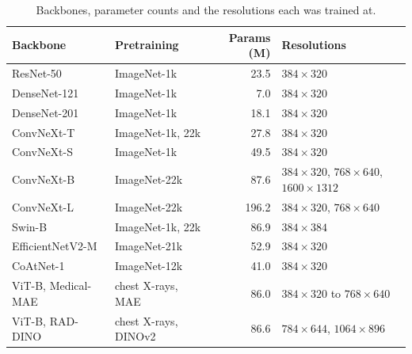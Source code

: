\documentclass{article}
\begin{document}
\begin{table}[H]
  \caption{Backbones, parameter counts and the resolutions each was trained at.}
  \centering
  \begin{tabular}{llrl}
    \toprule
    Backbone                                      & Pretraining          & Params (M) & Resolutions                                      \\
    \midrule
    ResNet-50 \cite{he2016resnet}                 & ImageNet-1k          & 23.5       & $384\times320$                                   \\
    DenseNet-121 \cite{huang2017densenet}         & ImageNet-1k          & 7.0        & $384\times320$                                   \\
    DenseNet-201 \cite{huang2017densenet}         & ImageNet-1k          & 18.1       & $384\times320$                                   \\
    ConvNeXt-T \cite{liu2022convnext}             & ImageNet-1k, 22k     & 27.8       & $384\times320$                                   \\
    ConvNeXt-S \cite{liu2022convnext}             & ImageNet-1k          & 49.5       & $384\times320$                                   \\
    ConvNeXt-B \cite{liu2022convnext}             & ImageNet-22k         & 87.6       & $384\times320$, $768\times640$, $1600\times1312$ \\
    ConvNeXt-L \cite{liu2022convnext}             & ImageNet-22k         & 196.2      & $384\times320$, $768\times640$                   \\
    Swin-B \cite{liu2021swin}                     & ImageNet-1k, 22k     & 86.9       & $384\times384$                                   \\
    EfficientNetV2-M \cite{tan2021efficientnetv2} & ImageNet-21k         & 52.9       & $384\times320$                                   \\
    CoAtNet-1 \cite{dai2021coatnet}               & ImageNet-12k         & 41.0       & $384\times320$                                   \\
    ViT-B, Medical-MAE \cite{xiao2023medicalmae}  & chest X-rays, MAE    & 86.0       & $384\times320$ to $768\times640$                 \\
    ViT-B, RAD-DINO \cite{perezgarcia2024raddino} & chest X-rays, DINOv2 & 86.6       & $784\times644$, $1064\times896$                  \\
    \bottomrule
  \end{tabular}
  \label{tab:models}
\end{table}
\end{document}
